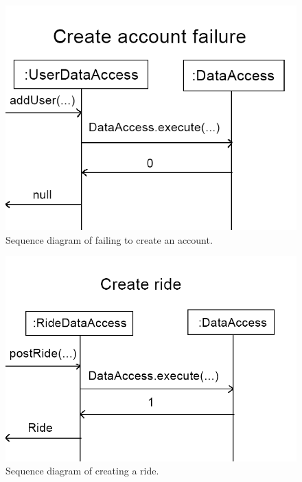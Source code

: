 \documentclass{article}
\begin{document}
\begin{figure}[h]
  \centering
  \includegraphics[scale=0.3]{seqdiagram5.png}
  \caption{Sequence diagram of failing to create an account.}
  \label{fig:seq5}
\end{figure}

\begin{figure}[h]
  \centering
  \includegraphics[scale=0.3]{seqdiagram6.png}
  \caption{Sequence diagram of creating a ride.}
  \label{fig:seq6}
\end{figure}
\end{document}
